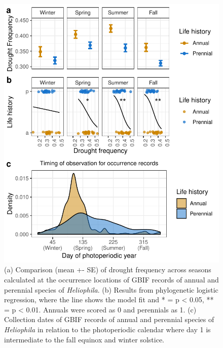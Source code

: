 \documentclass[man,floatsintext]{apa6}
\theoremstyle{definition}
\theoremstyle{definition}
\theoremstyle{definition}
\theoremstyle{remark}
\begin{document}
\begin{figure}[!h]
\includegraphics[width=\textwidth]{../figures/line_and_dates} \caption{(a) Comparison (mean +- SE) of drought frequency across
seasons calculated at the occurrence locations of GBIF records of annual
and perennial species of \emph{Heliophila}. (b) Results from
phylogenetic logistic regression, where the line shows the model fit and
* = p \textless{} 0.05, ** = p \textless{} 0.01. Annuals were scored as
0 and perennials as 1. (c) Collection dates of GBIF records of annual
and perennial species of \emph{Heliophila} in relation to the
photoperiodic calendar where day 1 is intermediate to the fall equinox
and winter solstice.}\label{fig:lineplots}
\end{figure}
\end{document}
